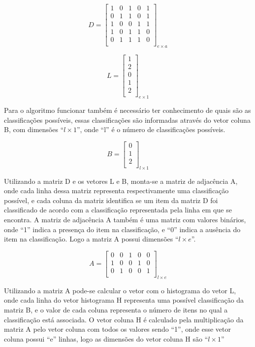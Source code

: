 \begin{anexosenv}
$$D=\left[
\begin{array}{ccccc}
1 & 0 & 1 & 0 & 1 \\
0 & 1 & 1 & 0 & 1 \\
1 & 0 & 0 & 1 & 1 \\
1 & 0 & 1 & 1 & 0 \\
0 & 1 & 1 & 1 & 0 \\
\end{array}
\right]_{e \times a}$$

$$L=\left[
\begin{array}{c}
1 \\
2 \\
0 \\
1 \\
2 \\
\end{array}
\right]_{e \times 1}$$

Para o algoritmo funcionar também é necessário ter conhecimento de quais são as
classificações possíveis, essas classificações são informadas
através do vetor coluna B, com dimensões ``${l \times 1}$'', onde ``l'' é o número
de classificações possíveis.

$$B=\left[
\begin{array}{c}
0 \\
1 \\
2 \\
\end{array}
\right]_{l \times 1}$$

Utilizando a matriz D e os vetores L e B, monta-se a matriz de adjacência A, onde
cada linha dessa matriz representa respectivamente uma classificação possível, e cada
coluna da matriz identifica se um item da matriz D foi classificado de acordo
com a classificação representada pela linha em que se encontra. A matriz de adjacência A também é uma
matriz com valores binários, onde ``1'' indica a presença do item na classificação,
e ``0'' indica a ausência do item na classificação. Logo a matriz A possui
dimensões ``${l \times e}$''.

$$A=\left[
\begin{array}{ccccc}
0 & 0 & 1 & 0 & 0 \\
1 & 0 & 0 & 1 & 0 \\
0 & 1 & 0 & 0 & 1 \\
\end{array}
\right]_{l \times e}$$

Utilizando a matriz A pode-se calcular o vetor com o histograma do vetor L, onde
cada linha do vetor histograma H representa uma possível
classificação da matriz B, e o valor de cada coluna representa o número de itens
no qual a classificação está associada. O vetor coluna H é calculado pela multiplicação da matriz A pelo
vetor coluna com todos os valores sendo ``1'', onde esse vetor coluna possui ``e''
linhas, logo as dimensões do vetor coluna H são ``${l \times 1}$''


\end{anexosenv}
